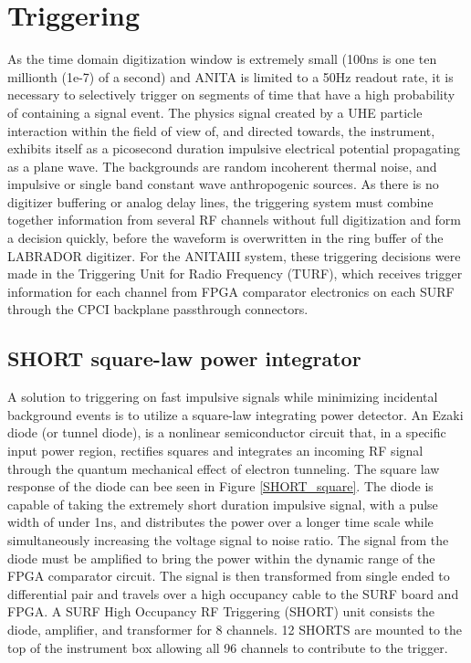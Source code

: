 		
\section{Triggering}
	As the time domain digitization window is extremely small (100ns is one ten millionth (1e-7) of a second) and ANITA is limited to a 50Hz readout rate, it is necessary to selectively trigger on segments of time that have a high probability of containing a signal event.  The physics signal created by a UHE particle interaction within the field of view of, and directed towards, the instrument, exhibits itself as a picosecond duration impulsive electrical potential propagating as a plane wave.  The backgrounds are random incoherent thermal noise, and impulsive or single band constant wave anthropogenic sources.  As there is no digitizer buffering or analog delay lines, the triggering system must combine together information from several RF channels without full digitization and form a decision quickly, before the waveform is overwritten in the ring buffer of the LABRADOR digitizer.  For the ANITAIII system, these triggering decisions were made in the Triggering Unit for Radio Frequency (TURF), which receives trigger information for each channel from FPGA comparator electronics on each SURF through the CPCI backplane passthrough connectors.
	
	\subsection{SHORT square-law power integrator}
		A solution to triggering on fast impulsive signals while minimizing incidental background events is to utilize a square-law integrating power detector.  An Ezaki diode (or tunnel diode)\cite{Esaki}, is a nonlinear semiconductor circuit that, in a specific input power region, rectifies squares and integrates an incoming RF signal through the quantum mechanical effect of electron tunneling.  The square law response of the diode can bee seen in Figure \ref{SHORT_square}.  The diode is capable of taking the extremely short duration impulsive signal, with a pulse width of under 1ns, and distributes the power over a longer time scale while simultaneously increasing the voltage signal to noise ratio.  The signal from the diode must be amplified to bring the power within the dynamic range of the FPGA comparator circuit.  The signal is then transformed from single ended to differential pair and travels over a high occupancy cable to the SURF board and FPGA.  A SURF High Occupancy RF Triggering (SHORT) unit consists the diode, amplifier, and transformer for 8 channels.  12 SHORTS are mounted to the top of the instrument box allowing all 96 channels to contribute to the trigger.
		

